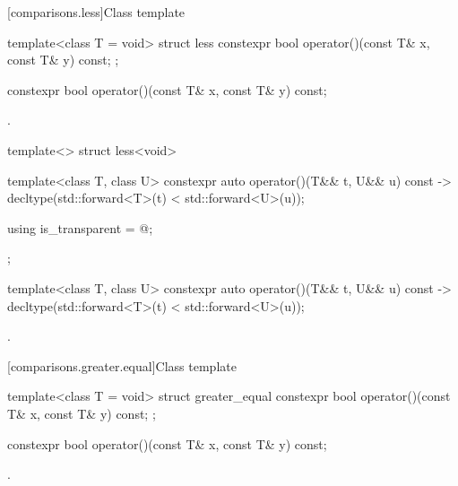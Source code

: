 [comparisons.less]{Class template }

%
\begin{itemdecl}
template<class T = void> struct less {
  constexpr bool operator()(const T& x, const T& y) const;
};
\end{itemdecl}

%
\begin{itemdecl}
constexpr bool operator()(const T& x, const T& y) const;
\end{itemdecl}

\begin{itemdescr}
\pnum
\returns
{}.
\end{itemdescr}

%
\begin{itemdecl}
template<> struct less<void> {
  template<class T, class U> constexpr auto operator()(T&& t, U&& u) const
    -> decltype(std::forward<T>(t) < std::forward<U>(u));

  using is_transparent = @\unspec@;
};
\end{itemdecl}

%
\begin{itemdecl}
template<class T, class U> constexpr auto operator()(T&& t, U&& u) const
    -> decltype(std::forward<T>(t) < std::forward<U>(u));
\end{itemdecl}

\begin{itemdescr}
\pnum
\returns
{}.
\end{itemdescr}

[comparisons.greater.equal]{Class template }

%
\begin{itemdecl}
template<class T = void> struct greater_equal {
  constexpr bool operator()(const T& x, const T& y) const;
};
\end{itemdecl}

%
\begin{itemdecl}
constexpr bool operator()(const T& x, const T& y) const;
\end{itemdecl}

\begin{itemdescr}
\pnum
\returns
{}.
\end{itemdescr}

